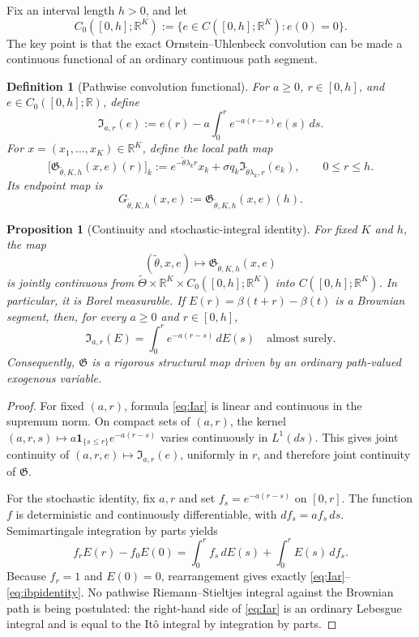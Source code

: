 \documentclass[11pt]{article}
\newtheorem{definition}[assumption]{Definition}
\newtheorem{proposition}[assumption]{Proposition}
\theoremstyle{remark}
\newcommand{\R}{\mathbb R}
\newcommand{\1}{\mathbf 1}
\newcommand{\ThetaI}{\widetilde\Theta}
\begin{document}
Fix an interval length \(h>0\), and let
\[
  C_0([0,h];\R^K)
  :=\{e\in C([0,h];\R^K):e(0)=0\}.
\]
The key point is that the exact Ornstein--Uhlenbeck convolution can be made a continuous functional of an ordinary continuous path segment.

\begin{definition}[Pathwise convolution functional]\label{def:pathfunctional}
For \(a\ge0\), \(r\in[0,h]\), and \(e\in C_0([0,h];\R)\), define
\begin{equation}\label{eq:Iar}
  \mathfrak I_{a,r}(e)
  :=e(r)-a\int_0^r e^{-a(r-s)}e(s)\,ds.
\end{equation}
For \(x=(x_1,\ldots,x_K)\in\R^K\), define the local path map
\begin{equation}\label{eq:Gpath}
 \bigl[\mathfrak G_{\widetilde\theta,K,h}(x,e)(r)\bigr]_k
 :=e^{-\widetilde\theta\lambda_kr}x_k
   +\sigma q_k\mathfrak I_{\widetilde\theta\lambda_k,r}(e_k),
 \qquad 0\le r\le h.
\end{equation}
Its endpoint map is
\[
  G_{\widetilde\theta,K,h}(x,e)
  :=\mathfrak G_{\widetilde\theta,K,h}(x,e)(h).
\]
\end{definition}

\begin{proposition}[Continuity and stochastic-integral identity]\label{prop:pathmap}
For fixed \(K\) and \(h\), the map
\[
 (\widetilde\theta,x,e)
 \longmapsto
 \mathfrak G_{\widetilde\theta,K,h}(x,e)
\]
is jointly continuous from
\(\ThetaI\times\R^K\times C_0([0,h];\R^K)\) into \(C([0,h];\R^K)\).  In particular, it is Borel measurable.  If \(E(r)=\beta(t+r)-\beta(t)\) is a Brownian segment, then, for every \(a\ge0\) and \(r\in[0,h]\),
\begin{equation}\label{eq:ibpidentity}
 \mathfrak I_{a,r}(E)
 =\int_0^r e^{-a(r-s)}\,dE(s)
 \quad\text{almost surely}.
\end{equation}
Consequently, \(\mathfrak G\) is a rigorous structural map driven by an ordinary path-valued exogenous variable.
\end{proposition}

\begin{proof}
For fixed \((a,r)\), formula \eqref{eq:Iar} is linear and continuous in the supremum norm.  On compact sets of \((a,r)\), the kernel \((a,r,s)\mapsto a\1_{\{s\le r\}}e^{-a(r-s)}\) varies continuously in \(L^1(ds)\).  This gives joint continuity of \((a,r,e)\mapsto\mathfrak I_{a,r}(e)\), uniformly in \(r\), and therefore joint continuity of \(\mathfrak G\).

For the stochastic identity, fix \(a,r\) and set \(f_s=e^{-a(r-s)}\) on \([0,r]\).  The function \(f\) is deterministic and continuously differentiable, with \(df_s=af_s\,ds\).  Semimartingale integration by parts yields
\[
 f_rE(r)-f_0E(0)
 =\int_0^r f_s\,dE(s)+\int_0^r E(s)\,df_s.
\]
Because \(f_r=1\) and \(E(0)=0\), rearrangement gives exactly \eqref{eq:Iar}--\eqref{eq:ibpidentity}.  No pathwise Riemann--Stieltjes integral against the Brownian path is being postulated: the right-hand side of \eqref{eq:Iar} is an ordinary Lebesgue integral and is equal to the It\^o integral by integration by parts.
\end{proof}
\end{document}
